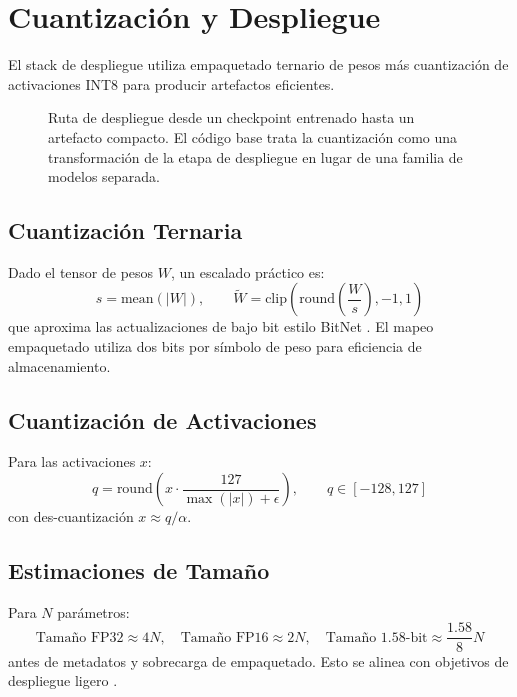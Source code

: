 \section{Cuantización y Despliegue}
\label{sec:quantization}

El stack de despliegue utiliza empaquetado ternario de pesos más cuantización de activaciones INT8 para producir artefactos eficientes.

\begin{figure}[t]
\centering
{}
\caption{Ruta de despliegue desde un checkpoint entrenado hasta un artefacto compacto. El código base trata la cuantización como una transformación de la etapa de despliegue en lugar de una familia de modelos separada.}
\label{fig:deploy-flow}
\end{figure}

\subsection{Cuantización Ternaria}
Dado el tensor de pesos $W$, un escalado práctico es:
\[
s=\text{mean}(|W|),\qquad
\tilde{W}=\text{clip}\left(\text{round}\left(\frac{W}{s}\right),-1,1\right)
\]
que aproxima las actualizaciones de bajo bit estilo BitNet \citep{wang_bitnet_2023}. El mapeo empaquetado utiliza dos bits por símbolo de peso para eficiencia de almacenamiento.

\subsection{Cuantización de Activaciones}
Para las activaciones $x$:
\[
q=\text{round}\left(x\cdot\frac{127}{\max(|x|)+\epsilon}\right),\qquad q\in[-128,127]
\]
con des-cuantización $x\approx q/\alpha$.

\subsection{Estimaciones de Tamaño}
Para $N$ parámetros:
\[
\text{Tamaño FP32}\approx 4N,\quad \text{Tamaño FP16}\approx 2N,\quad \text{Tamaño 1.58-bit}\approx \frac{1.58}{8}N
\]
antes de metadatos y sobrecarga de empaquetado. Esto se alinea con objetivos de despliegue ligero \citep{samson_lightweight_2026,bravin_embbert_2026}.

